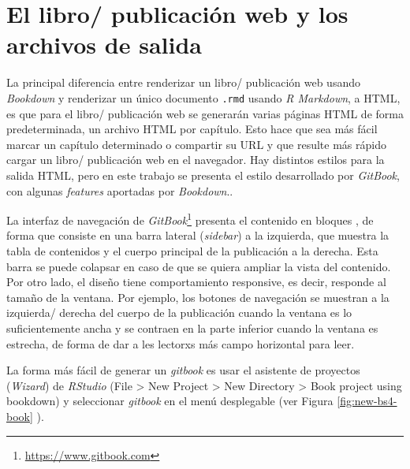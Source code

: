 \documentclass[
]{krantz}
\DeclareRobustCommand{\href}[2]{#2\footnote{\url{#1}}}
\begin{document}
\hypertarget{el-libro-publicaciuxf3n-web-y-los-archivos-de-salida}{%
\section{El libro/ publicación web y los archivos de salida}\label{el-libro-publicaciuxf3n-web-y-los-archivos-de-salida}}

La principal diferencia entre renderizar un libro/ publicación web usando \emph{Bookdown} y renderizar un único documento \texttt{.rmd} usando \emph{R Markdown}, a HTML, es que para el libro/ publicación web se generarán varias páginas HTML de forma predeterminada, un archivo HTML por capítulo. Esto hace que sea más fácil marcar un capítulo determinado o compartir su URL y que resulte más rápido cargar un libro/ publicación web en el navegador. Hay distintos estilos para la salida HTML, pero en este trabajo se presenta el estilo desarrollado por \emph{GitBook}, con algunas \emph{features} aportadas por \emph{Bookdown}..

La interfaz de navegación \citep{manovichLenguajeNuevosMedios2006} de \href{https://www.gitbook.com}{\emph{GitBook}} presenta el contenido en bloques \citep{seminariopublicacionesdigitalesUnidadParte2021b}, de forma que consiste en una barra lateral (\emph{sidebar}) a la izquierda, que muestra la tabla de contenidos y el cuerpo principal de la publicación a la derecha. Esta barra se puede colapsar en caso de que se quiera ampliar la vista del contenido. Por otro lado, el diseño tiene comportamiento responsive, es decir, responde al tamaño de la ventana. Por ejemplo, los botones de navegación se muestran a la izquierda/ derecha del cuerpo de la publicación cuando la ventana es lo suficientemente ancha y se contraen en la parte inferior cuando la ventana es estrecha, de forma de dar a les lectorxs más campo horizontal para leer.

La forma más fácil de generar un \emph{gitbook} es usar el asistente de proyectos (\emph{Wizard}) de \emph{RStudio} (File \textgreater{} New Project \textgreater{} New Directory \textgreater{} Book project using bookdown) y seleccionar \emph{gitbook} en el menú desplegable (ver Figura \ref{fig:new-bs4-book} ).
\end{document}
